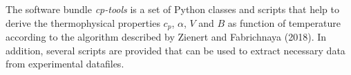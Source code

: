 %
The software bundle \emph{cp-tools} is a set of Python classes and scripts that help to derive the thermophysical properties $c_p$, $\alpha$, $V$ and $B$ as function of temperature according to the algorithm described by Zienert and Fabrichnaya (2018)\cite{Zienert2018}. In addition, several scripts are provided that can be used to extract necessary data from experimental datafiles.
